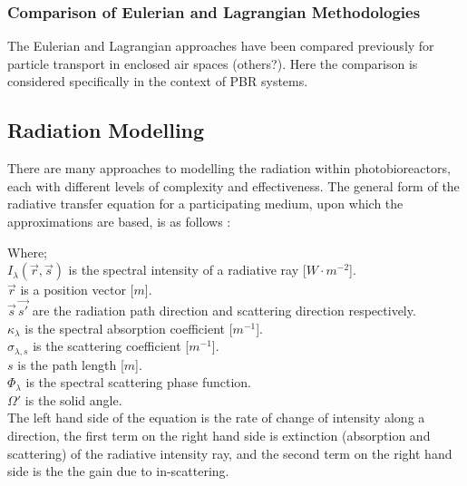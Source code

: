 \subsubsection{Comparison of Eulerian and Lagrangian Methodologies}

The Eulerian and Lagrangian approaches have been compared previously for particle transport in enclosed air spaces \cite{Zhang2007} (others?). Here the comparison is considered specifically in the context of PBR systems.


\subsection{Radiation Modelling}
\label{S:radiation}
There are many approaches to modelling the radiation within photobioreactors, each with different levels of complexity and effectiveness. The general form of the radiative transfer equation for a participating medium, upon which the approximations are based, is as follows \cite{Modest2003}:



Where;\\
$I_\lambda (\vec{r}, \vec{s})$ is the spectral intensity of a radiative ray [$W \cdot m^{-2}$]. \\
$\vec{r}$ is a position vector [$m$]. \\
$\vec{s} \, \vec{s'}$ are the radiation path direction and scattering direction respectively.\\
$\kappa_\lambda$ is the spectral absorption coefficient [$m^{-1}$]. \\
$\sigma_{\lambda, s}$ is the scattering coefficient [$m^{-1}$].  \\
$s$ is the path length [$m$]. \\
$\Phi_\lambda$ is the spectral scattering phase function. \\
$\Omega'$ is the solid angle. \\

The left hand side of the equation is the rate of change of intensity along a direction, the first term on the right hand side is extinction (absorption and scattering) of the radiative intensity ray, and the second term on the right hand side is the the gain due to in-scattering.

